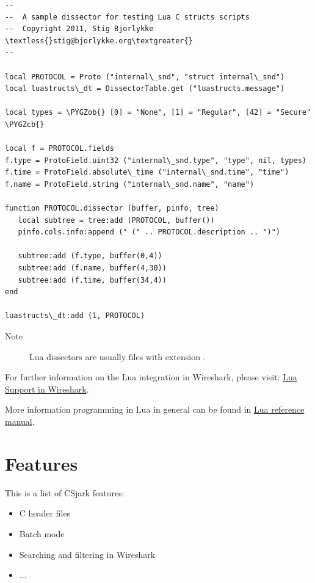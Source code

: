 \documentclass[A4paper,10pt,english]{sphinxmanual}
\def\PYGZob{\char`\{}
\def\PYGZcb{\char`\}}
\begin{document}
\begin{Verbatim}[commandchars=\\\{\}]
--
--  A sample dissector for testing Lua C structs scripts
--  Copyright 2011, Stig Bjorlykke \textless{}stig@bjorlykke.org\textgreater{}
--

local PROTOCOL = Proto ("internal\_snd", "struct internal\_snd")
local luastructs\_dt = DissectorTable.get ("luastructs.message")

local types = \PYGZob{} [0] = "None", [1] = "Regular", [42] = "Secure" \PYGZcb{}

local f = PROTOCOL.fields
f.type = ProtoField.uint32 ("internal\_snd.type", "type", nil, types)
f.time = ProtoField.absolute\_time ("internal\_snd.time", "time")
f.name = ProtoField.string ("internal\_snd.name", "name")

function PROTOCOL.dissector (buffer, pinfo, tree)
   local subtree = tree:add (PROTOCOL, buffer())
   pinfo.cols.info:append (" (" .. PROTOCOL.description .. ")")

   subtree:add (f.type, buffer(0,4))
   subtree:add (f.name, buffer(4,30))
   subtree:add (f.time, buffer(34,4))
end

luastructs\_dt:add (1, PROTOCOL)
\end{Verbatim}

\begin{description}
\item[Note]
Lua dissectors are usually files with extension .
\end{description}

For further information on the Lua integration in Wireshark, please visit:
\href{http://www.wireshark.org/docs/wsug\_html\_chunked/wsluarm.html}{Lua Support in Wireshark}.

More information programming in Lua in general can be found in \href{http://www.lua.org/manual/5.1/}{Lua reference manual}.


\section{Features}
\label{user/features::doc}\label{user/features:features}
This is a list of CSjark features:
\begin{itemize}
\item {} 
C header files

\item {} 
Batch mode

\item {} 
Searching and filtering in Wireshark

\item {} 
...

\end{itemize}
\end{document}
